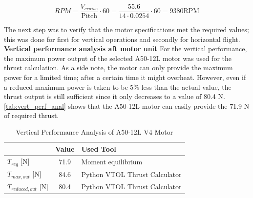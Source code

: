 {\begin{equation*}
RPM = \frac{V_{cruise}}{\textrm{Pitch}} \cdot 60 = \frac{55.6}{14 \cdot 0.0254} \cdot 60  = 9380  \textrm{RPM}
\end{equation*}

The next step was to verify that the motor specifications met the required values; this was done for first for vertical operations and secondly for horizontal flight.\\

\noindent \textbf{Vertical performance analysis aft motor unit} For the vertical performance, the maximum power output of the selected A50-12L motor was used for the thrust calculation. As a side note, the motor can only provide the maximum power for a limited time; after a certain time it might overheat. However, even if a reduced maximum power is taken to be 5\% less than the actual value, the thrust output is still sufficient since it only decreases to a value of 80.4 N. \autoref{tab:vert_perf_anal} shows that the A50-12L motor can easily provide the 71.9 N of required thrust.

\begin{table}[H]
\centering
\caption{Vertical Performance Analysis of A50-12L V4 Motor}
\label{tab:vert_perf_anal}
    \begin{tabular}{lcl}
    \toprule
                 &\bfseries Value & \bfseries Used Tool                     \\ \midrule
    $T_{req}$ {[}N{]} & 71.9  & Moment equilibrium            \\\hdashline
    $T_{max,out}$ {[}N{]} & 84.6  & Python VTOL Thrust Calculator           \\\hdashline
    $T_{reduced,out}$ {[}N{]} & 80.4  & Python VTOL Thrust Calculator \\ \bottomrule
    \end{tabular}
\end{table}

}
